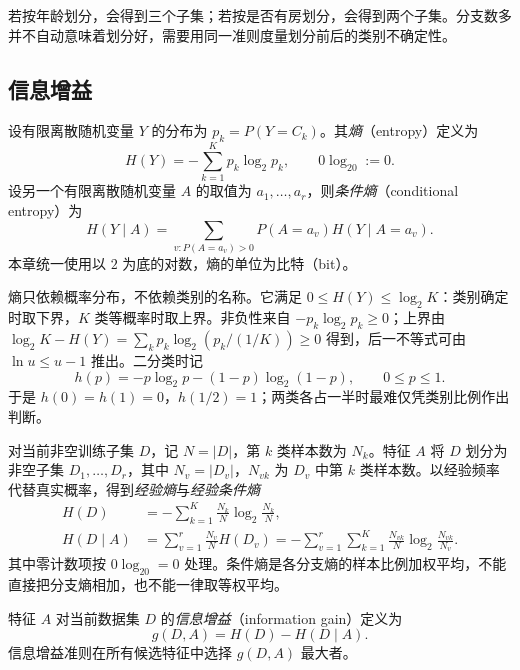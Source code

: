 若按年龄划分，会得到三个子集；若按是否有房划分，会得到两个子集。分支数多并不自动意味着划分好，需要用同一准则度量划分前后的类别不确定性。

\subsection{信息增益}

\begin{definition}[熵与条件熵]
设有限离散随机变量 $Y$ 的分布为 $p_k=P(Y=C_k)$。其\emph{熵}（entropy）定义为
\begin{equation}
  H(Y)=-\sum_{k=1}^K p_k\log_2p_k,\qquad 0\log_20:=0.
  \label{eq:lihang-tree-entropy}
\end{equation}
设另一个有限离散随机变量 $A$ 的取值为 $a_1,\ldots,a_r$，则\emph{条件熵}（conditional entropy）为
\[
  H(Y\mid A)=\sum_{v:P(A=a_v)>0}P(A=a_v)H(Y\mid A=a_v).
\]
本章统一使用以 $2$ 为底的对数，熵的单位为比特（bit）。
\end{definition}

熵只依赖概率分布，不依赖类别的名称。它满足 $0\leq H(Y)\leq\log_2K$：类别确定时取下界，$K$ 类等概率时取上界。非负性来自 $-p_k\log_2p_k\geq0$；上界由 $\log_2K-H(Y)=\sum_kp_k\log_2(p_k/(1/K))\geq0$ 得到，后一不等式可由 $\ln u\leq u-1$ 推出。二分类时记
\[
  h(p)=-p\log_2p-(1-p)\log_2(1-p),\qquad 0\leq p\leq1.
\]
于是 $h(0)=h(1)=0$，$h(1/2)=1$；两类各占一半时最难仅凭类别比例作出判断。

对当前非空训练子集 $D$，记 $N=|D|$，第 $k$ 类样本数为 $N_k$。特征 $A$ 将 $D$ 划分为非空子集 $D_1,\ldots,D_r$，其中 $N_v=|D_v|$，$N_{vk}$ 为 $D_v$ 中第 $k$ 类样本数。以经验频率代替真实概率，得到\emph{经验熵}与\emph{经验条件熵}
\begin{align}
  H(D)&=-\sum_{k=1}^K\frac{N_k}{N}\log_2\frac{N_k}{N},
  \label{eq:lihang-tree-empirical-entropy}\\
  H(D\mid A)&=\sum_{v=1}^r\frac{N_v}{N}H(D_v)
  =-\sum_{v=1}^r\sum_{k=1}^K\frac{N_{vk}}{N}\log_2\frac{N_{vk}}{N_v}.
  \label{eq:lihang-tree-conditional-entropy}
\end{align}
其中零计数项按 $0\log_20=0$ 处理。条件熵是各分支熵的样本比例加权平均，不能直接把分支熵相加，也不能一律取等权平均。

\begin{definition}[信息增益]
特征 $A$ 对当前数据集 $D$ 的\emph{信息增益}（information gain）定义为
\begin{equation}
  g(D,A)=H(D)-H(D\mid A).
  \label{eq:lihang-tree-information-gain}
\end{equation}
信息增益准则在所有候选特征中选择 $g(D,A)$ 最大者。
\end{definition}

